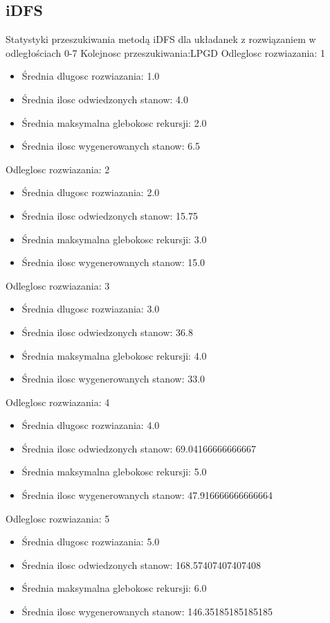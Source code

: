 \documentclass{classrep}
\begin{document}
			\subsection{iDFS}
				Statystyki przeszukiwania metodą iDFS dla układanek z rozwiązaniem w odległościach 0-7
				\newline
				Kolejnosc przeszukiwania:LPGD
				Odleglosc rozwiazania: 1
				\begin{itemize}
					\item Średnia dlugosc rozwiazania: 1.0
					\item Średnia ilosc odwiedzonych stanow: 4.0
					\item Średnia maksymalna glebokosc rekursji: 2.0
					\item Średnia ilosc wygenerowanych stanow: 6.5
				\end{itemize}
				Odleglosc rozwiazania: 2
				\begin{itemize}
					\item Średnia dlugosc rozwiazania: 2.0
					\item Średnia ilosc odwiedzonych stanow: 15.75
					\item Średnia maksymalna glebokosc rekursji: 3.0
					\item Średnia ilosc wygenerowanych stanow: 15.0
				\end{itemize}
				Odleglosc rozwiazania: 3
				\begin{itemize}
					\item Średnia dlugosc rozwiazania: 3.0
					\item Średnia ilosc odwiedzonych stanow: 36.8
					\item Średnia maksymalna glebokosc rekursji: 4.0
					\item Średnia ilosc wygenerowanych stanow: 33.0
				\end{itemize}
				Odleglosc rozwiazania: 4
				\begin{itemize}
					\item Średnia dlugosc rozwiazania: 4.0
					\item Średnia ilosc odwiedzonych stanow: 69.04166666666667
					\item Średnia maksymalna glebokosc rekursji: 5.0
					\item Średnia ilosc wygenerowanych stanow: 47.916666666666664
				\end{itemize}
				Odleglosc rozwiazania: 5
				\begin{itemize}
					\item Średnia dlugosc rozwiazania: 5.0
					\item Średnia ilosc odwiedzonych stanow: 168.57407407407408
					\item Średnia maksymalna glebokosc rekursji: 6.0
					\item Średnia ilosc wygenerowanych stanow: 146.35185185185185
				\end{itemize}
\end{document}

